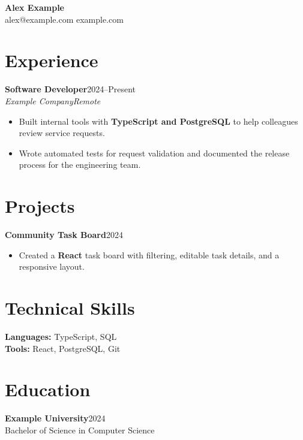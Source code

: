 \documentclass[letterpaper,11pt]{article}
\newcommand{\resumeItem}[1]{\item\small{#1}}
\newcommand{\resumeSubheading}[4]{\noindent\textbf{#1}\hfill #2\\\textit{#3}\hfill\textit{#4}}
\newcommand{\resumeProjectHeading}[2]{\noindent\textbf{#1}\hfill #2}
\begin{document}
\begin{center}
{\LARGE\textbf{Alex Example}}\\
alex@example.com \quad example.com
\end{center}
\section*{Experience}
\resumeSubheading{Software Developer}{2024--Present}{Example Company}{Remote}
\begin{itemize}[leftmargin=*,itemsep=4pt]
\resumeItem{Built internal tools with \textbf{TypeScript and PostgreSQL} to help colleagues review service requests.}
\resumeItem{Wrote automated tests for request validation and documented the release process for the engineering team.}
\end{itemize}
\section*{Projects}
\resumeProjectHeading{Community Task Board}{2024}
\begin{itemize}[leftmargin=*]
\resumeItem{Created a \textbf{React} task board with filtering, editable task details, and a responsive layout.}
\end{itemize}
\section*{Technical Skills}
\textbf{Languages:} TypeScript, SQL\\
\textbf{Tools:} React, PostgreSQL, Git
\section*{Education}
\textbf{Example University}\hfill 2024\\
Bachelor of Science in Computer Science
\end{document}
